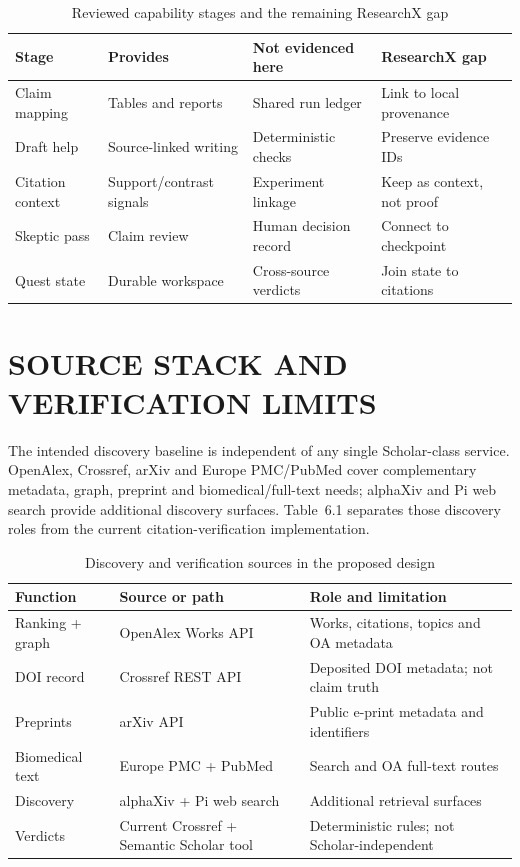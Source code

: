 \documentclass[12pt,a4paper]{report}
\numberwithin{equation}{chapter}
\begin{document}
\begin{table}[ht]
\centering
\caption{Reviewed capability stages and the remaining ResearchX gap}
\small
\begin{tabular}{@{}L{2.7cm}L{3.2cm}L{4.2cm}L{4.1cm}@{}}
\toprule
Stage & Provides & Not evidenced here & ResearchX gap \\
\midrule
Claim mapping & Tables and reports & Shared run ledger & Link to local provenance \\
Draft help & Source-linked writing & Deterministic checks & Preserve evidence IDs \\
Citation context & Support/contrast signals & Experiment linkage & Keep as context, not proof \\
Skeptic pass & Claim review & Human decision record & Connect to checkpoint \\
Quest state & Durable workspace & Cross-source verdicts & Join state to citations \\
\bottomrule
\end{tabular}
\end{table}

\chapter{SOURCE STACK AND VERIFICATION LIMITS}

The intended discovery baseline is independent of any single Scholar-class
service. OpenAlex, Crossref, arXiv and Europe PMC/PubMed cover complementary
metadata, graph, preprint and biomedical/full-text needs; alphaXiv and Pi web
search provide additional discovery surfaces. Table~6.1 separates those
discovery roles from the current citation-verification implementation.

\begin{table}[ht]
\centering
\caption{Discovery and verification sources in the proposed design}
\small
\begin{tabular}{@{}L{2.4cm}L{4.1cm}L{5.7cm}@{}}
\toprule
Function & Source or path & Role and limitation \\
\midrule
Ranking + graph & OpenAlex Works API & Works, citations, topics and OA metadata \\
DOI record & Crossref REST API & Deposited DOI metadata; not claim truth \\
Preprints & arXiv API & Public e-print metadata and identifiers \\
Biomedical text & Europe PMC + PubMed & Search and OA full-text routes \\
Discovery & alphaXiv + Pi web search & Additional retrieval surfaces \\
Verdicts & Current Crossref + Semantic Scholar tool & Deterministic rules; not Scholar-independent \\
\bottomrule
\end{tabular}
\end{table}
\end{document}
